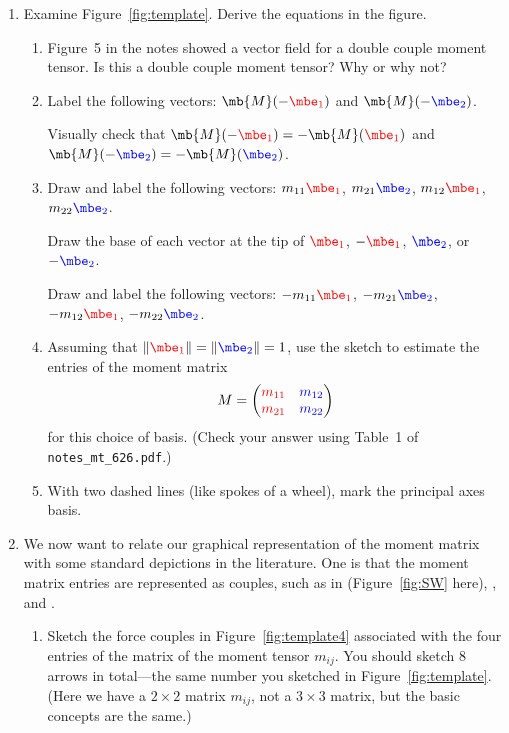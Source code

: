 \documentclass[11pt,titlepage,fleqn]{article}
\newcommand{\mtfile}{\texttt{notes\_mt\_626.pdf}}
\newcommand{\eone}{\textcolor{red}{\mbe_1}}
\newcommand{\etwo}{\textcolor{blue}{\mbe_2}}
\begin{document}
\begin{enumerate}

\item Examine Figure~\ref{fig:template}. Derive the equations in the figure.
\label{prob:bigvec}

\begin{enumerate}
\item Figure~5 in the notes showed a vector field for a double couple moment tensor. Is this a double couple moment tensor? Why or why not?

\item Label the following vectors: $\mb{M}(-\eone)$ and $\mb{M}(-\etwo)$.

Visually check that $\mb{M}(-\eone) = -\mb{M}(\eone)$ and $\mb{M}(-\etwo) = -\mb{M}(\etwo)$.

\item Draw and label the following vectors: $m_{11}\eone$, $m_{21}\etwo$, $m_{12}\eone$, $m_{22}\etwo$.

Draw the base of each vector at the tip of $\eone$, $-\eone$, $\etwo$, or $-\etwo$.

Draw and label the following vectors: $-m_{11}\eone$, $-m_{21}\etwo$, $-m_{12}\eone$, $-m_{22}\etwo$.

\item Assuming that $\|\eone\| = \|\etwo\| = 1$, use the sketch to estimate the entries of the moment matrix
%
\begin{equation*}
M = \begin{pmatrix} \textcolor{red}{m_{11}} & \textcolor{blue}{m_{12}} \\ \textcolor{red}{m_{21}} & \textcolor{blue}{m_{22}} \end{pmatrix}
\end{equation*}
%
for this choice of basis.
(Check your answer using Table~1 of \mtfile.)

\item With two dashed lines (like spokes of a wheel), mark the principal axes basis.

\end{enumerate}


\item 
\label{prob:matrix}
We now want to relate our graphical representation of the moment matrix with some standard depictions in the literature. One is that the moment matrix entries are represented as couples, such as in \citet[][Figure 4.4-4]{SteinWysession} (Figure~\ref{fig:SW} here), \citet[][Figure~9.2]{ShearerE2}, and \citet[][Figure 3.7]{AkiRichardsE2}.
%
\begin{enumerate}
\item Sketch the force couples in Figure~\ref{fig:template4} associated with the four entries of the matrix of the moment tensor $m_{ij}$. You should sketch 8 arrows in total---the same number you sketched in Figure~\ref{fig:template}.
(Here we have a $2 \times 2$ matrix $m_{ij}$, not a $3 \times 3$ matrix, but the basic concepts are the same.)


\end{enumerate}
\end{enumerate}
\end{document}
